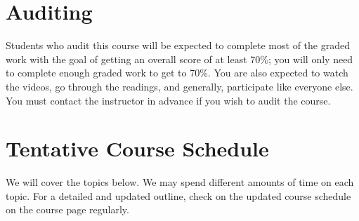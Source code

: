 \documentclass[11pt, a4paper]{article}
\begin{document}
\section{Auditing}
Students who audit this course will be expected to complete most of the graded work with the goal of getting an overall score of at least 70\%; you will only need to complete enough graded work to get to 70\%. You are also expected to watch the videos, go through the readings, and generally, participate like everyone else. You must contact the instructor in advance if you wish to audit the course.



\section{Tentative Course Schedule} 
We will cover the topics below. We may spend different amounts of time on each topic. For a detailed and updated outline, check on the updated course schedule on the course page regularly. 
\end{document}
